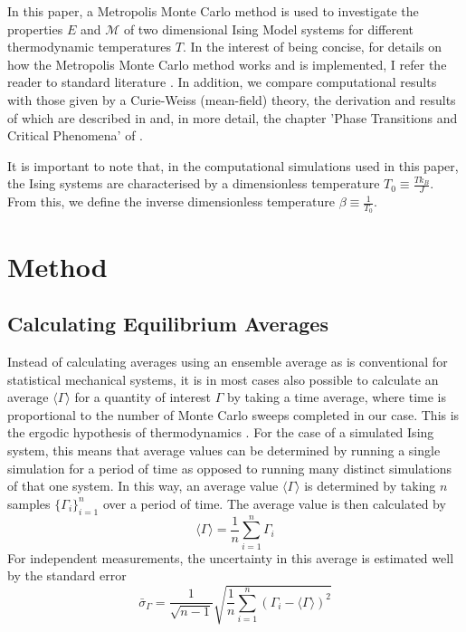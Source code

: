 \documentclass[11pt]{iopart}
\begin{document}
In this paper, a Metropolis Monte Carlo method is used to investigate the properties $E$ and $\mathcal{M}$ of two dimensional Ising Model systems for different thermodynamic temperatures $T$. In the interest of being concise, for details on how the Metropolis Monte Carlo method works and is implemented, I refer the reader to standard literature \cite{montecarlo}. In addition, we compare computational results with those given by a Curie-Weiss (mean-field) theory, the derivation and results of which are described in \cite{handout} and, in more detail, the chapter 'Phase Transitions and Critical Phenomena' of \cite{meanfield}.

It is important to note that, in the computational simulations used in this paper, the Ising systems are characterised by a dimensionless temperature $T_0 \equiv \frac{T k_B}{J}$. From this, we define the inverse dimensionless temperature $\beta \equiv \frac{1}{T_0}$.

\section{Method}

\subsection{Calculating Equilibrium Averages}

Instead of calculating averages using an ensemble average as is conventional for statistical mechanical systems, it is in most cases also possible to calculate an average $\langle \Gamma \rangle$ for a quantity of interest $\Gamma$ by taking a time average, where time is proportional to the number of Monte Carlo sweeps completed in our case. This is the ergodic hypothesis of thermodynamics \cite{statmech}.  For the case of a simulated Ising system, this means that average values can be determined by running a single simulation for a period of time as opposed to running many distinct simulations of that one system. In this way, an average value $\langle \Gamma \rangle$ is determined by taking $n$ samples $\{ \Gamma_i \}_{i=1}^{n}$ over a period of time. The average value is then calculated by
\begin{equation}
\label{eq:averages}
\langle \Gamma \rangle = \frac{1}{n}\sum_{i=1}^{n} \Gamma_i
\end{equation}
For independent measurements, the uncertainty in this average is estimated well by the standard error \cite{handout}
\begin{equation}
\label{eq:standarderror}
\bar{\sigma}_{\Gamma} = \frac{1}{\sqrt{n-1}} \sqrt{ \frac{1}{n} \sum_{i=1}^{n} \left( \Gamma_i - \langle \Gamma \rangle \right)^2 }
\end{equation}
\end{document}
